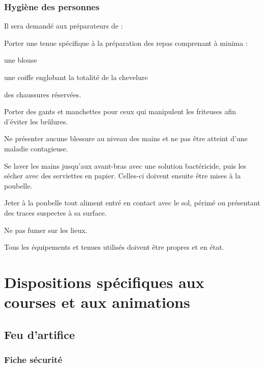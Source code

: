 \documentclass[hidelinks, paper=a4, fontsize=13pt]{report}
\begin{document}
\subsection{Hygiène des personnes}
Il sera demandé aux préparateurs de :

\begin{list}{•}{}
	\item Porter une tenue spécifique à la préparation des repas comprenant à minima :
	\begin{list}{-}{}
		\item une blouse
		\item une coiffe englobant la totalité de la chevelure 
		\item des chaussures réservées.
	\end{list}
	\item Porter des gants et manchettes pour ceux qui manipulent les friteuses afin d’éviter les brûlures.
	\item Ne présenter aucune blessure au niveau des mains et ne pas être atteint d’une maladie contagieuse.
	\item Se laver les mains jusqu’aux avant-bras avec une solution bactéricide, puis les sécher avec des serviettes en papier. Celles-ci doivent ensuite être mises à la poubelle.
	\item Jeter à la poubelle tout aliment entré en contact avec le sol, périmé ou présentant des traces suspectes à sa surface.  
	\item Ne pas fumer sur les lieux.
\end{list}

Tous les équipements et tenues utilisés doivent être propres et en état.

\newpage


\chapter{ Dispositions spécifiques aux courses et aux animations}
\section{Feu d’artifice}
\subsection{Fiche sécurité}
\end{document}
